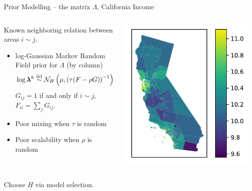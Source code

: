 \documentclass[10.5pt, aspectratio=169]{beamer} %
\newcommand{\iid}{\stackrel{\mbox{\scriptsize iid}}{\sim}}
\begin{document}
\begin{frame}{Prior Modelling -- the matrix $\Lambda$, California Income}

\begin{columns}
\begin{column}{0.65\textwidth}

Known neighboring relation between areas $i \sim j$.

\begin{itemize}
	\item log-Gaussian Markov Random Field prior for $\Lambda$ (by column)
	\[
		\log \bm \lambda^h \iid \mathcal{N}_H\left(\mu, \left(\tau (F - \rho G)\right)^{-1}\right)
	\]
	$G_{ij} = 1$ if and only if $i \sim j$, $F_{ii} = \sum_{j} G_{ij}$.
	
	\item Poor mixing when $\tau$ is random
	
	\item Poor scalability when $\rho$ is random
\end{itemize}

\end{column}

\begin{column}{0.35\textwidth}
\centering
\includegraphics[width=0.95\linewidth]{example_income}
\end{column}

\end{columns}

\pause

\vspace{0.5cm}

Choose $H$ via model selection.

\end{frame}
\end{document}
